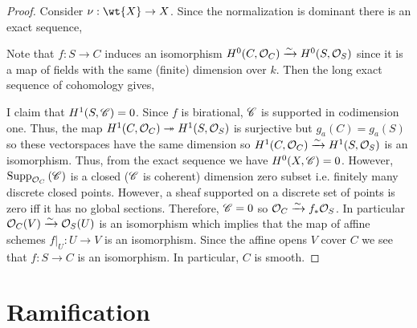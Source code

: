 \documentclass[12pt]{article}
\begin{document}
\begin{proof}
Consider $\nu : \wt{X} \to X$. Since the normalization is dominant there is an exact sequence,
\begin{center}
\end{center}
Note that $f : S \to C$ induces an isomorphism $H^0(C, \mathcal{O}_{C}) \xrightarrow{\sim} H^0(S, \mathcal{O}_{S})$ since it is a map of fields with the same (finite) dimension over $k$. Then the long exact sequence of cohomology gives,
\begin{center}
\end{center}
I claim that $H^1(S, \mathscr{C}) = 0$. Since $f$ is birational, $\mathscr{C}$ is supported in codimension one. Thus, the map $H^1(C, \mathcal{O}_{C}) \twoheadrightarrow H^1(S, \mathcal{O}_{S})$ is surjective but $g_a(C) = g_a(S)$ so these vectorspaces have the same dimension so $H^1(C, \mathcal{O}_{C}) \xrightarrow{\sim} H^1(S, \mathcal{O}_{S})$ is an isomorphism. Thus, from the exact sequence we have $H^0(X, \mathscr{C}) = 0$. However, $\mathrm{Supp}_{\mathcal{O}_{C}}\left(\mathscr{C} \right)$ is a closed ($\mathscr{C}$ is coherent) dimension zero subset i.e. finitely many discrete closed points. However, a sheaf supported on a discrete set of points is zero iff it has no global sections. Therefore, $\mathscr{C} = 0$ so $\mathcal{O}_{C} \xrightarrow{\sim} f_* \mathcal{O}_{S}$. In particular $\mathcal{O}_{C}(V) \xrightarrow{\sim} \mathcal{O}_{S}(U)$ is an isomorphism which implies that the map of affine schemes $f|_U : U \to V$ is an isomorphism. Since the affine opens $V$ cover $C$ we see that $f : S \to C$ is an isomorphism. In particular, $C$ is smooth.
\end{proof}

\section{Ramification}
\end{document}
